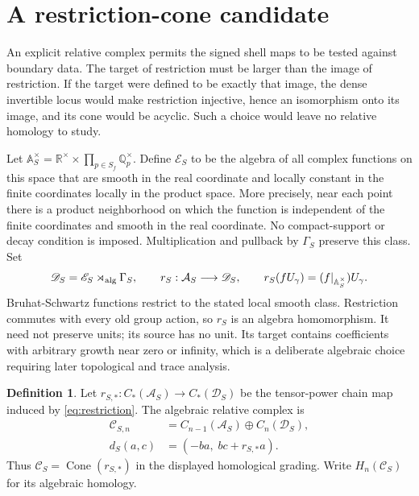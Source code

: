 \documentclass[11pt,letterpaper]{article}
\theoremstyle{definition}
\newtheorem{definition}[theorem]{Definition}
\theoremstyle{remark}
\newcommand{\R}{\mathbb R}
\newcommand{\Q}{\mathbb Q}
\newcommand{\Acal}{\mathcal A}
\newcommand{\Cone}{\operatorname{Cone}}
\begin{document}
\section{A restriction-cone candidate}

An explicit relative complex permits the signed shell maps to be
tested against boundary data. The target of restriction must be
larger than the image of restriction. If the target were defined
to be exactly that image, the dense invertible locus would make
restriction injective, hence an isomorphism onto its image, and
its cone would be acyclic. Such a choice would leave no relative
homology to study.

Let $\mathbb A_S^\times=\R^\times\times\prod_{p\in S_f}\Q_p^\times$.
Define $\mathscr E_S$ to be the algebra of all complex functions on
this space that are smooth in the real coordinate and locally
constant in the finite coordinates locally in the product space.
More precisely, near each point there is a product neighborhood
on which the function is independent of the finite coordinates
and smooth in the real coordinate. No compact-support or decay
condition is imposed. Multiplication and pullback by
$\Gamma_S$ preserve this class. Set
\begin{equation}
 \mathscr D_S=\mathscr E_S\rtimes_{\rm alg}\Gamma_S,\qquad
 r_S:\Acal_S\longrightarrow\mathscr D_S,\qquad
 r_S(fU_\gamma)=(f|_{\mathbb A_S^\times})U_\gamma.
 \label{eq:restriction}
\end{equation}
Bruhat-Schwartz functions restrict to the stated local smooth class.
Restriction commutes with every old group action, so $r_S$ is an
algebra homomorphism. It need not preserve units; its source has no
unit. Its target contains coefficients with arbitrary growth near
zero or infinity, which is a deliberate algebraic choice requiring
later topological and trace analysis.

\begin{definition}\label{def:cone}
Let $r_{S,*}:C_*(\Acal_S)\to C_*(\mathscr D_S)$ be the tensor-power
chain map induced by \eqref{eq:restriction}. The algebraic relative
complex is
\begin{align}
 \mathscr C_{S,n}&=C_{n-1}(\Acal_S)\oplus C_n(\mathscr D_S),\label{eq:cone-space}\\
 d_S(a,c)&=(-b a,\; b c+r_{S,*}a).
 \label{eq:cone-differential}
\end{align}
Thus $\mathscr C_S=\Cone(r_{S,*})$ in the displayed homological
grading. Write $H_n(\mathscr C_S)$ for its algebraic homology.
\end{definition}
\end{document}
